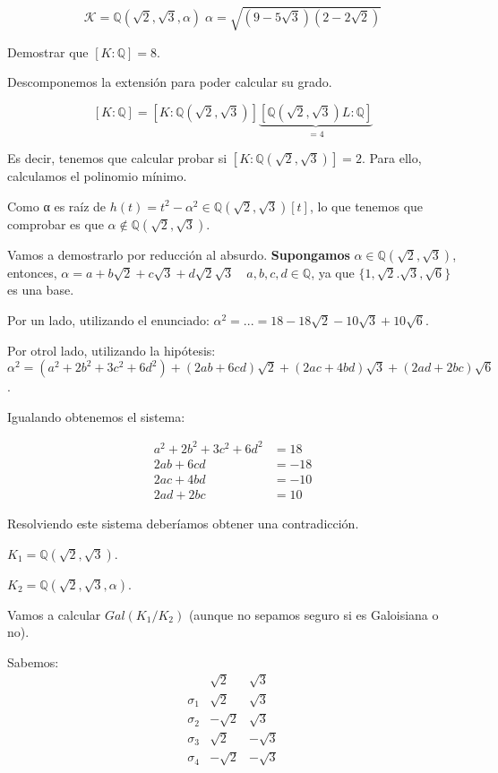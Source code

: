 \begin{problem}[5]
$$\mathcal{K} = ℚ(\sqrt{2},\sqrt{3},α)\; α = \sqrt{(9-5\sqrt{3})(2-2\sqrt{2})}$$

Demostrar que $[K:ℚ] = 8$.
\solution

Descomponemos la extensión para poder calcular su grado.

$$[K:ℚ] = [K: ℚ(\sqrt{2},\sqrt{3})]\underbrace{[ℚ(\sqrt{2},\sqrt{3})L:ℚ]}_{=4}$$

Es decir, tenemos que calcular probar si $[K: ℚ(\sqrt{2},\sqrt{3})]= 2$. Para ello, calculamos el polinomio mínimo.

Como α es raíz de $h(t) = t^2-α^2 ∈ℚ(\sqrt{2},\sqrt{3})[t]$, lo que tenemos que comprobar es que $α∉ℚ(\sqrt{2},\sqrt{3})$.

Vamos a demostrarlo por reducción al absurdo. \textbf{Supongamos} $α∈ℚ(\sqrt{2},\sqrt{3})$, entonces, $α = a+b\sqrt{2} + c \sqrt{3} + d\sqrt{2}\sqrt{3}\quad a,b,c,d∈ℚ$, ya que $\{1,\sqrt{2}.\sqrt{3},\sqrt{6}\}$ es una base.

Por un lado, utilizando el enunciado: $α^2 =  ... = 18-18\sqrt{2} - 10\sqrt{3} + 10\sqrt{6}$.

Por otrol lado, utilizando la hipótesis:
$α^2 =(a^2+2b^2 + 3c^2 + 6d^2) + (2ab + 6cd) \sqrt{2} + (2ac + 4bd)\sqrt{3}+(2ad + 2bc) \sqrt{6}$.

Igualando obtenemos el sistema:

\[
\begin{array}{cc}
a^2+2b^2 + 3c^2 + 6d^2 &= 18\\2ab + 6cd &= -18 \\ 2ac + 4bd &= -10\\ 2ad + 2bc &= 10
\end{array}
\]

Resolviendo este sistema deberíamos obtener una contradicción.


\ppart

$K_1 = ℚ(\sqrt{2},\sqrt{3})$.

$K_2 = ℚ(\sqrt{2},\sqrt{3},α)$.


Vamos a calcular $Gal(K_1/K_2)$ (aunque no sepamos seguro si es Galoisiana o no).

Sabemos: $$\begin{array}{c|c|c}
&\sqrt{2}&\sqrt{3}\\\hline
σ_1 & \sqrt{2} & \sqrt{3}\\
σ_2 & - \sqrt{2} & \sqrt{3}\\
σ_3 & \sqrt{2} & -\sqrt{3}\\
σ_4 & - \sqrt{2} & -\sqrt{3}\end{array}
$$


\end{problem}

